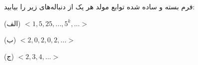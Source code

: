 	\p
	فرم بسته و ساده شده توابع مولد هر یک از دنباله‌های زیر را بیابید:
			
			(الف) $<1,5,25,...,5^k,...>$
			
			(ب) $< 2,0,2,0,2,...>$
			
								(ج) $<2,3,4,...>$